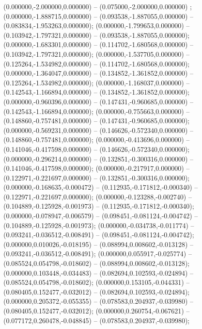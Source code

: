  (0.000000,-2.000000,0.000000) -- (0.075000,-2.000000,0.000000) ;
 (0.000000,-1.888715,0.000000) -- (0.093538,-1.887055,0.000000) -- (0.083834,-1.953263,0.000000);
 (0.000000,-1.799653,0.000000) -- (0.103942,-1.797321,0.000000) -- (0.093538,-1.887055,0.000000);
 (0.000000,-1.683301,0.000000) -- (0.114702,-1.680568,0.000000) -- (0.103942,-1.797321,0.000000);
 (0.000000,-1.537705,0.000000) -- (0.125264,-1.534982,0.000000) -- (0.114702,-1.680568,0.000000);
 (0.000000,-1.364047,0.000000) -- (0.134852,-1.361852,0.000000) -- (0.125264,-1.534982,0.000000);
 (0.000000,-1.168037,0.000000) -- (0.142543,-1.166894,0.000000) -- (0.134852,-1.361852,0.000000);
 (0.000000,-0.960396,0.000000) -- (0.147431,-0.960685,0.000000) -- (0.142543,-1.166894,0.000000);
 (0.000000,-0.755663,0.000000) -- (0.148860,-0.757481,0.000000) -- (0.147431,-0.960685,0.000000);
 (0.000000,-0.569231,0.000000) -- (0.146626,-0.572340,0.000000) -- (0.148860,-0.757481,0.000000);
 (0.000000,-0.413696,0.000000) -- (0.141046,-0.417598,0.000000) -- (0.146626,-0.572340,0.000000);
 (0.000000,-0.296214,0.000000) -- (0.132851,-0.300316,0.000000) -- (0.141046,-0.417598,0.000000);
 (0.000000,-0.217917,0.000000) -- (0.122971,-0.221697,0.000000) -- (0.132851,-0.300316,0.000000);
 (0.000000,-0.168635,-0.000472) -- (0.112935,-0.171812,-0.000340) -- (0.122971,-0.221697,0.000000);
 (0.000000,-0.123288,-0.002740) -- (0.104889,-0.125928,-0.001973) -- (0.112935,-0.171812,-0.000340);
 (0.000000,-0.078947,-0.006579) -- (0.098451,-0.081124,-0.004742) -- (0.104889,-0.125928,-0.001973);
 (0.000000,-0.034738,-0.011774) -- (0.093241,-0.036512,-0.008491) -- (0.098451,-0.081124,-0.004742);
 (0.000000,0.010026,-0.018195) -- (0.088994,0.008602,-0.013128) -- (0.093241,-0.036512,-0.008491);
 (0.000000,0.055917,-0.025774) -- (0.085524,0.054798,-0.018602) -- (0.088994,0.008602,-0.013128);
 (0.000000,0.103448,-0.034483) -- (0.082694,0.102593,-0.024894) -- (0.085524,0.054798,-0.018602);
 (0.000000,0.153105,-0.044331) -- (0.080405,0.152477,-0.032012) -- (0.082694,0.102593,-0.024894);
 (0.000000,0.205372,-0.055355) -- (0.078583,0.204937,-0.039980) -- (0.080405,0.152477,-0.032012);
 (0.000000,0.260754,-0.067621) -- (0.077172,0.260478,-0.048845) -- (0.078583,0.204937,-0.039980);
